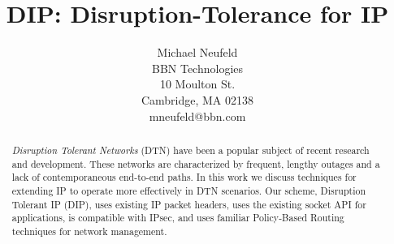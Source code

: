 \documentclass[10pt,letterpaper]{article}
\begin{document}
\title{\large \bf DIP: Disruption-Tolerance for IP}
\author{Michael Neufeld \\
BBN Technologies \\
10 Moulton St. \\
Cambridge, MA 02138 \\
mneufeld@bbn.com}

\maketitle

\begin{abstract}
{\em Disruption Tolerant Networks} (DTN) have been a popular subject
of recent research and development. These networks are characterized
by frequent, lengthy outages and a lack of contemporaneous end-to-end paths.
In this work we discuss techniques for extending IP to operate more
effectively in DTN scenarios. Our scheme, Disruption Tolerant IP (DIP),
uses existing IP packet headers, uses the existing socket API for applications,
is compatible with IPsec, and uses familiar Policy-Based Routing techniques
for network management.
\end{abstract}
\end{document}

